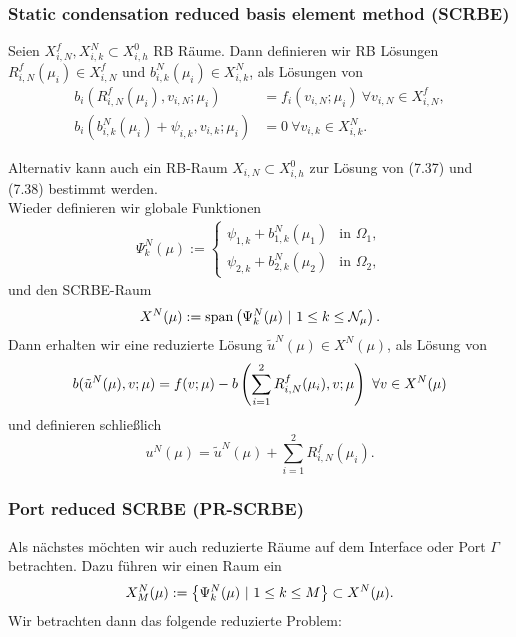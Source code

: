 \subsubsection{Static condensation reduced basis element method (SCRBE)}
Seien $X_{i,N}^f,X_{i,k}^N \subset X_{i,h}^0$ RB Räume.
Dann definieren wir RB Lösungen $R_{i,N}^f(\mu_i)\in X_{i,N}^f$ und $b_{i,k}^N(\mu_i)\in X_{i,k}^N$, als Lösungen von 
\begin{align}
b_i(R_{i,N}^f(\mu_i),v_{i,N};\mu_i) &= f_i(v_{i,N};\mu_i) ~\forall v_{i,N}\in X_{i,N}^f,\\
b_i(b_{i,k}^N(\mu_i) + \psi_{i,k}, v_{i,k};\mu_i) &= 0 ~\forall v_{i,k}\in X_{i,k}^N.
\end{align}

Alternativ kann auch ein RB-Raum $X_{i,N}\subset X_{i,h}^0$ zur Lösung von (7.37) und (7.38) bestimmt werden.\\

Wieder definieren wir globale Funktionen
\begin{align}
\Psi_k^N(\mu) := \left\{\begin{array}{lc} \psi_{1,k} + b_{1,k}^N(\mu_1) & \text{in } \Omega_1,\\ \psi_{2,k} + b_{2,k}^N(\mu_2) & \text{in } \Omega_2, \end{array}\right.
\end{align}
und den SCRBE-Raum
\begin{align}
X^N(\mu) := \operatorname{span} \left( \Psi_k^N(\mu)~|~1\le k\le \mathcal{N}_\mu\right).
\end{align}
Dann erhalten wir eine reduzierte Lösung $\tilde{u}^N(\mu)\in X^N(\mu)$, als Lösung von
\begin{align}
b(\tilde{u}^N(\mu),v;\mu) = f(v;\mu) - b\left( \sum_{i=1}^2 R_{i,N}^f(\mu_i),v;\mu\right) ~\forall v\in X^N(\mu)
\end{align}
und definieren schließlich
\[
u^N(\mu) = \tilde{u}^N(\mu) + \sum_{i=1}^2 R_{i,N}^f(\mu_i).
\]

\subsubsection{Port reduced SCRBE (PR-SCRBE)}
Als nächstes möchten wir auch reduzierte Räume auf dem Interface oder Port $\Gamma$ betrachten.
Dazu führen wir einen  Raum ein
\begin{align}
X_M^N(\mu) := \left\{\Psi_k^N(\mu)~|~ 1\le k\le M\right\} \subset X^N(\mu).
\end{align}
Wir betrachten dann das folgende reduzierte Problem:

